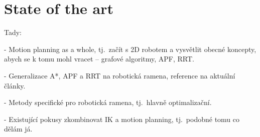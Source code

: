 \chapter{State of the art}\label{SotA}

Tady:

- Motion planning as a whole, tj.\ začít s 2D robotem a vysvětlit obecné koncepty, abych se k tomu mohl vracet -- grafové algoritmy, APF, RRT.

- Generalizace A*, APF a RRT na robotická ramena, reference na aktuální články.

- Metody specifické pro robotická ramena, tj.\ hlavně optimalizační.

- Existující pokusy zkombinovat IK a motion planning, tj.\ podobné tomu co dělám já.
